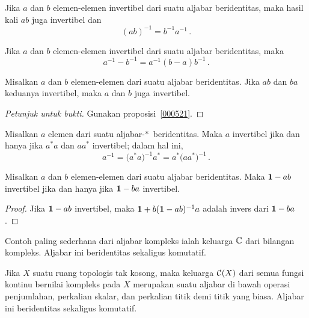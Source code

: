 \begin{prop} Jika $a$ dan $b$ elemen-elemen invertibel dari suatu aljabar beridentitas, maka hasil kali
$ab$ juga invertibel dan
  \[ (ab)^{-1} = b^{-1}a^{-1}\,. \]
\end{prop}

\begin{prop}\label{000524} Jika $a$ dan $b$ elemen-elemen invertibel dari suatu aljabar beridentitas,
maka
  \[ a^{-1} - b^{-1} = a^{-1}(b - a)b^{-1}\,. \]
\end{prop}

\begin{prop} Misalkan $a$ dan $b$ elemen-elemen dari suatu aljabar beridentitas. Jika $ab$ dan
$ba$ keduanya invertibel, maka $a$ dan $b$ juga invertibel.
\end{prop}

\begin{proof}[\emph{Petunjuk untuk bukti}] Gunakan proposisi~\ref{000521}. \ns \end{proof}

\begin{cor} Misalkan $a$ elemen dari suatu aljabar-$*\,$ beridentitas. Maka $a$ invertibel jika dan hanya jika $a^*a$ dan $aa^*$
invertibel; dalam hal ini,
   \[ a^{-1} = \bigl(a^*a\bigr)^{-1}a^* = a^*\big(aa^*\bigr)^{-1}\,. \]
\end{cor}

\begin{prop}\label{000526} Misalkan $a$ dan $b$ elemen-elemen dari suatu aljabar beridentitas. Maka
$\mathbf{1} - ab$ invertibel jika dan hanya jika $\mathbf{1} - ba$ invertibel.
\end{prop}

\begin{proof} Jika $\mathbf{1} - ab$ invertibel, maka $\mathbf{1} + b(\mathbf{1} - ab)^{-1}a$ adalah
invers dari $\mathbf{1} - ba$.
\end{proof}

\begin{exam} Contoh paling sederhana dari aljabar kompleks ialah keluarga $\mathbb{C}$ dari bilangan
kompleks. Aljabar ini beridentitas sekaligus komutatif.
\end{exam}

\begin{exam}\label{000532} Jika $X$ suatu ruang topologis tak kosong, maka keluarga $\mathcal{C}(X)$
dari semua fungsi kontinu bernilai kompleks pada $X$ merupakan suatu
aljabar di bawah operasi penjumlahan, perkalian skalar, dan perkalian titik demi titik yang biasa.
Aljabar ini beridentitas sekaligus komutatif.
\end{exam}

